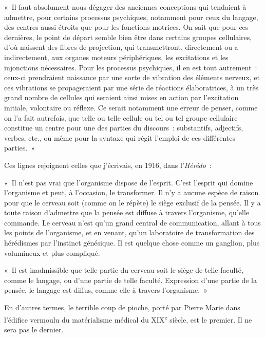 \documentclass[french,twoside]{book} %
\begin{document}
« Il faut absolument nous dégager des anciennes conceptions qui tendaient à admettre, pour certains processus psychiques, notamment pour ceux du langage, des centres aussi étroits que pour les fonctions motrices. On sait que pour ces dernières, le point de départ semble bien être dans certains groupes cellulaires, d’où naissent des fibres de projection, qui transmettront, directement ou a indirectement, aux organes moteurs périphériques, les excitations et les injonctions nécessaires. Pour les processus psychiques, il en est tout autrement : ceux-ci prendraient naissance par une sorte de vibration des éléments nerveux, et ces vibrations se propageraient par une série de réactions élaboratrices, à un très grand nombre de cellules qui seraient ainsi mises en action par l’excitation initiale, volontaire ou réflexe. Ce serait notamment une erreur de penser, comme on l’a fait autrefois, que telle ou telle cellule ou tel ou tel groupe cellulaire constitue un centre pour une des parties du discours : substantifs, adjectifs, verbes, etc., ou même pour la syntaxe qui régit l’emploi de ces différentes parties. »\par
Ces lignes rejoignent celles que j’écrivais, en 1916, dans l’{\itshape Hérédo} :\par
« Il n’est pas vrai que l’organisme dispose de l’esprit. C’est l’esprit qui domine l’organisme et peut, à l’occasion, le transformer. Il n’y a aucune espèce de raison pour que le cerveau soit (comme on le répète) le siège exclusif de la pensée. Il y a toute raison d’admettre que la pensée est diffuse à travers l’organisme, qu’elle commande. Le cerveau n’est qu’un grand central de communication, allant à tous les points de l’organisme, et en venant, qu’un laboratoire de transformation des hérédismes par l’instinct génésique. Il est quelque chose comme un ganglion, plus volumineux et plus compliqué.\par
« Il est inadmissible que telle partie du cerveau soit le siège de telle faculté, comme le langage, ou d’une partie de telle faculté. Expression d’une partie de la pensée, le langage est diffus, comme elle à travers l’organisme. »\par
En d’autres termes, le terrible coup de pioche, porté par Pierre Marie dans l’édifice vermoulu du matérialisme médical du XIX\textsuperscript{e} siècle, est le premier. Il ne sera pas le dernier.\par
\end{document}
